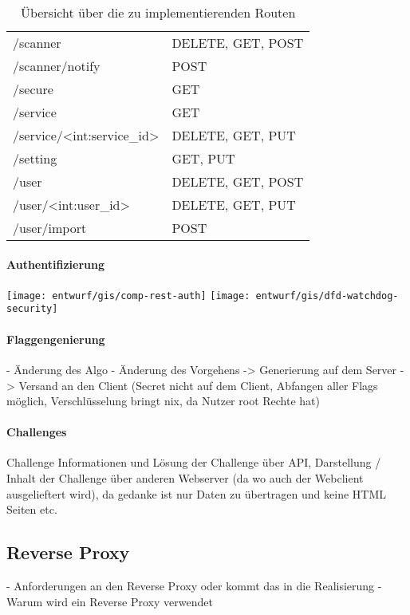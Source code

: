 \begin{table}
\begin{tabular}{l l}
		/scanner								 & DELETE, GET, POST \\
		/scanner/notify							 & POST \\
		/secure									 & GET \\
		/service								 & GET \\
		/service/<int:service\_id>				 & DELETE, GET, PUT \\
		/setting								 & GET, PUT \\
		/user									 & DELETE, GET, POST \\
		/user/<int:user\_id>					 & DELETE, GET, PUT \\
		/user/import							 & POST \\
	\end{tabular}
	\caption{Übersicht über die zu implementierenden Routen}
	\label{table:gis-routes}
\end{table}

\paragraph{Authentifizierung}
\texttt{[image: entwurf/gis/comp-rest-auth]}
\texttt{[image: entwurf/gis/dfd-watchdog-security]}

\paragraph{Flaggengenierung}
- Änderung des Algo
- Änderung des Vorgehens -> Generierung auf dem Server -> Versand an den Client (Secret nicht auf dem Client, Abfangen aller Flags möglich, Verschlüsselung bringt nix, da Nutzer root Rechte hat)

\paragraph{Challenges}

Challenge Informationen und Lösung der Challenge über API, Darstellung / Inhalt der Challenge über anderen Webserver (da wo auch der Webclient ausgelieftert wird), da gedanke ist nur Daten zu übertragen und keine HTML Seiten etc.

\subsection{Reverse Proxy}
- Anforderungen an den Reverse Proxy oder kommt das in die Realisierung
- Warum wird ein Reverse Proxy verwendet